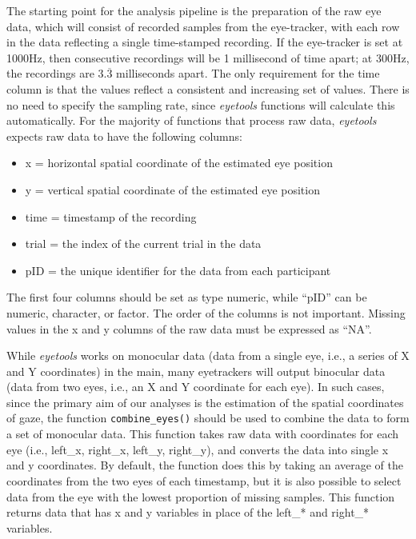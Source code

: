 \documentclass[
  man,
  floatsintext,
  longtable,
  nolmodern,
  notxfonts,
  notimes,
  colorlinks=true,linkcolor=blue,citecolor=blue,urlcolor=blue]{apa7}
\begin{document}
The starting point for the analysis pipeline is the preparation of the
raw eye data, which will consist of recorded samples from the
eye-tracker, with each row in the data reflecting a single time-stamped
recording. If the eye-tracker is set at 1000Hz, then consecutive
recordings will be 1 millisecond of time apart; at 300Hz, the recordings
are \(3.\overline{3}\) milliseconds apart. The only requirement for the
time column is that the values reflect a consistent and increasing set
of values. There is no need to specify the sampling rate, since
\emph{eyetools} functions will calculate this automatically. For the
majority of functions that process raw data, \emph{eyetools} expects raw
data to have the following columns:

\begin{itemize}
\item
  x = horizontal spatial coordinate of the estimated eye position
\item
  y = vertical spatial coordinate of the estimated eye position
\item
  time = timestamp of the recording
\item
  trial = the index of the current trial in the data
\item
  pID = the unique identifier for the data from each participant
\end{itemize}

The first four columns should be set as type numeric, while ``pID'' can
be numeric, character, or factor. The order of the columns is not
important. Missing values in the x and y columns of the raw data must be
expressed as ``NA''.

While \emph{eyetools} works on monocular data (data from a single eye,
i.e., a series of X and Y coordinates) in the main, many eyetrackers
will output binocular data (data from two eyes, i.e., an X and Y
coordinate for each eye). In such cases, since the primary aim of our
analyses is the estimation of the spatial coordinates of gaze, the
function \texttt{combine\_eyes()} should be used to combine the data to
form a set of monocular data. This function takes raw data with
coordinates for each eye (i.e., left\_x, right\_x, left\_y, right\_y),
and converts the data into single x and y coordinates. By default, the
function does this by taking an average of the coordinates from the two
eyes of each timestamp, but it is also possible to select data from the
eye with the lowest proportion of missing samples. This function returns
data that has x and y variables in place of the left\_* and right\_*
variables.
\end{document}

